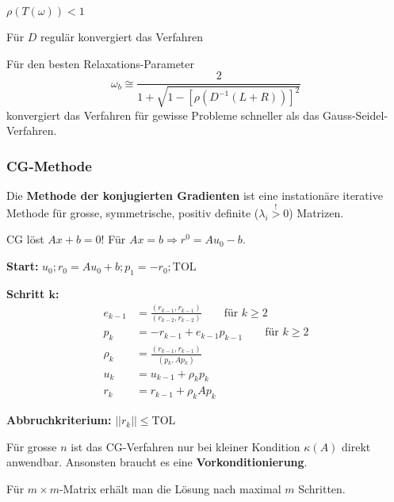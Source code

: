 			\begin{bedingung}
				$\rho(T(\omega)) < 1$
			\end{bedingung}

			\begin{bemerkungen}
				\item Für $D$ regulär konvergiert das Verfahren
				\item Für den besten Relaxations-Parameter \[
					\omega_b \cong \frac{2}{1 + \sqrt{1 - [\rho(D^{-1}(L+R))]^2}}
				\] konvergiert das Verfahren für gewisse Probleme schneller als das Gauss-Seidel-Verfahren.
			\end{bemerkungen}

		\subsubsection{CG-Methode}
			\label{cgrad}
			Die \textbf{Methode der konjugierten Gradienten} ist eine instationäre iterative Methode für grosse, symmetrische, positiv definite ($\lambda_i \overset{!}{>} 0$) Matrizen.

			\begin{achtung}
				CG löst $Ax + b = 0$! Für $Ax=b \Rightarrow r^0 = Au_0 - b$.
			\end{achtung}

			\begin{tightenumerate}
				\item \textbf{Start:} $u_0 ; r_0 = Au_0 + b ; p_1 = -r_0; \mathrm{TOL}$
				\item \textbf{Schritt $\boldsymbol k$:}
					\begin{align*}
						 e_{k-1} &= \frac{(r_{k-1}, r_{k-1})}{(r_{k-2},r_{k-2})} \qquad \text{für } k \geq 2 \\
						 p_k &= -r_{k-1} + e_{k-1}p_{k-1} \qquad \text{für } k \geq 2 \\
						 \rho_k &= \frac{(r_{k-1},r_{k-1})}{(p_k , Ap_k)} \\
						 u_k &= u_{k-1}+\rho_k p_k \\
						 r_k &= r_{k-1} + \rho_k A p_k
					\end{align*}
				\item \textbf{Abbruchkriterium:} $||r_k|| \leq \mathrm{TOL}$
			\end{tightenumerate}

			Für grosse $n$ ist das CG-Verfahren nur bei kleiner Kondition $\kappa(A)$ direkt anwendbar. Ansonsten braucht es eine \textbf{Vorkonditionierung}.

			Für $m \times m$-Matrix erhält man die Lösung nach maximal $m$ Schritten.


